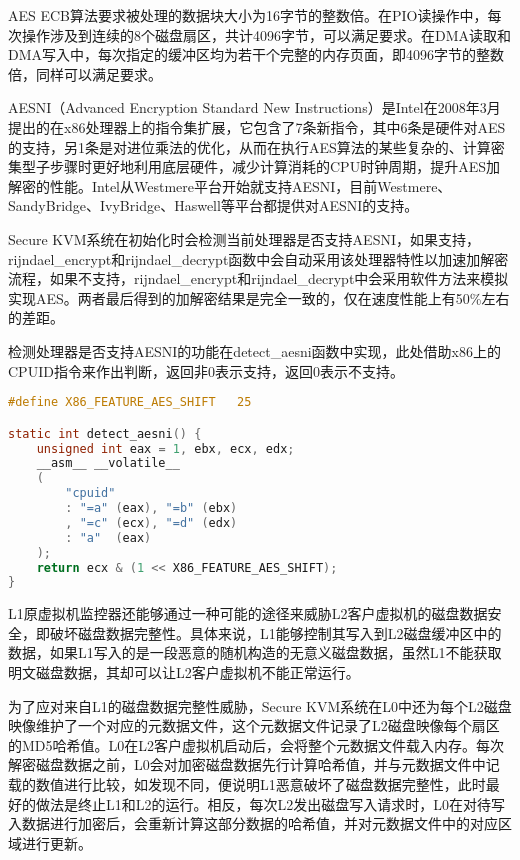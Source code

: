 AES ECB算法要求被处理的数据块大小为16字节的整数倍。在PIO读操作中，每次操作涉及到连续的8个磁盘扇区，共计4096字节，可以满足要求。在DMA读取和DMA写入中，每次指定的缓冲区均为若干个完整的内存页面，即4096字节的整数倍，同样可以满足要求。

AESNI（Advanced Encryption Standard New Instructions）\cite{rott2010intel}是Intel在2008年3月提出的在x86处理器上的指令集扩展，它包含了7条新指令，其中6条是硬件对AES的支持，另1条是对进位乘法的优化，从而在执行AES算法的某些复杂的、计算密集型子步骤时更好地利用底层硬件，减少计算消耗的CPU时钟周期，提升AES加解密的性能。Intel从Westmere平台开始就支持AESNI，目前Westmere、SandyBridge、IvyBridge、Haswell等平台都提供对AESNI的支持。

Secure KVM系统在初始化时会检测当前处理器是否支持AESNI，如果支持，rijndael\_encrypt和rijndael\_decrypt函数中会自动采用该处理器特性以加速加解密流程，如果不支持，rijndael\_encrypt和rijndael\_decrypt中会采用软件方法来模拟实现AES。两者最后得到的加解密结果是完全一致的，仅在速度性能上有50\%左右的差距。

检测处理器是否支持AESNI的功能在detect\_aesni函数中实现，此处借助x86上的CPUID指令来作出判断，返回非0表示支持，返回0表示不支持。

\begin{lstlisting}[language={C}, caption={detect\_aesni函数实现源码}]
#define X86_FEATURE_AES_SHIFT	25

static int detect_aesni() {
    unsigned int eax = 1, ebx, ecx, edx;
    __asm__ __volatile__
    (
        "cpuid"
        : "=a" (eax), "=b" (ebx)
        , "=c" (ecx), "=d" (edx)
        : "a"  (eax)
    );
    return ecx & (1 << X86_FEATURE_AES_SHIFT);
}
\end{lstlisting}

L1原虚拟机监控器还能够通过一种可能的途径来威胁L2客户虚拟机的磁盘数据安全，即破坏磁盘数据完整性。具体来说，L1能够控制其写入到L2磁盘缓冲区中的数据，如果L1写入的是一段恶意的随机构造的无意义磁盘数据，虽然L1不能获取明文磁盘数据，其却可以让L2客户虚拟机不能正常运行。

为了应对来自L1的磁盘数据完整性威胁，Secure KVM系统在L0中还为每个L2磁盘映像维护了一个对应的元数据文件，这个元数据文件记录了L2磁盘映像每个扇区的MD5哈希值。L0在L2客户虚拟机启动后，会将整个元数据文件载入内存。每次解密磁盘数据之前，L0会对加密磁盘数据先行计算哈希值，并与元数据文件中记载的数值进行比较，如发现不同，便说明L1恶意破坏了磁盘数据完整性，此时最好的做法是终止L1和L2的运行。相反，每次L2发出磁盘写入请求时，L0在对待写入数据进行加密后，会重新计算这部分数据的哈希值，并对元数据文件中的对应区域进行更新。

